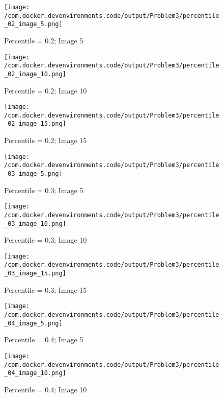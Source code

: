 \documentclass{article}%
\begin{document}
%


\begin{figure}[h!]%
\centering%
\texttt{[image: /com.docker.devenvironments.code/output/Problem3/percentile\_02\_image\_5.png]}%
\caption{Percentile = 0.2; Image 5}%
\end{figure}

%


\begin{figure}[h!]%
\centering%
\texttt{[image: /com.docker.devenvironments.code/output/Problem3/percentile\_02\_image\_10.png]}%
\caption{Percentile = 0.2; Image 10}%
\end{figure}

%


\begin{figure}[h!]%
\centering%
\texttt{[image: /com.docker.devenvironments.code/output/Problem3/percentile\_02\_image\_15.png]}%
\caption{Percentile = 0.2; Image 15}%
\end{figure}

%


\begin{figure}[h!]%
\centering%
\texttt{[image: /com.docker.devenvironments.code/output/Problem3/percentile\_03\_image\_5.png]}%
\caption{Percentile = 0.3; Image 5}%
\end{figure}

%


\begin{figure}[h!]%
\centering%
\texttt{[image: /com.docker.devenvironments.code/output/Problem3/percentile\_03\_image\_10.png]}%
\caption{Percentile = 0.3; Image 10}%
\end{figure}

%


\begin{figure}[h!]%
\centering%
\texttt{[image: /com.docker.devenvironments.code/output/Problem3/percentile\_03\_image\_15.png]}%
\caption{Percentile = 0.3; Image 15}%
\end{figure}

%


\begin{figure}[h!]%
\centering%
\texttt{[image: /com.docker.devenvironments.code/output/Problem3/percentile\_04\_image\_5.png]}%
\caption{Percentile = 0.4; Image 5}%
\end{figure}

%


\begin{figure}[h!]%
\centering%
\texttt{[image: /com.docker.devenvironments.code/output/Problem3/percentile\_04\_image\_10.png]}%
\caption{Percentile = 0.4; Image 10}%
\end{figure}
\end{document}
